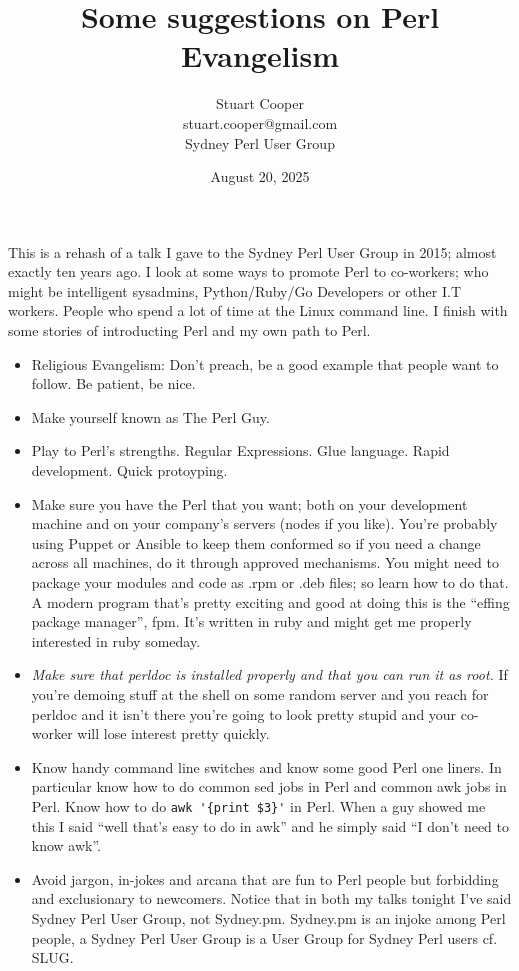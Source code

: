 \documentclass{article}
\title{Some suggestions on Perl Evangelism}
\author{Stuart Cooper\\stuart.cooper@gmail.com\\Sydney Perl User Group}
\date{August 20, 2025}
\begin{document}
\maketitle

This is a rehash of a talk I gave to the Sydney Perl User Group in
2015; almost exactly ten years ago. I look at some ways to
promote Perl to co-workers; who might be intelligent sysadmins,
Python/Ruby/Go Developers or other I.T workers. People
who spend a lot of time at the Linux command line. I finish with some
stories of introducting Perl and my own path to Perl.

\begin{itemize}
  \item Religious Evangelism: Don't preach, be a good example that
    people want to follow. Be patient, be nice.
  \item Make yourself known as The Perl Guy.
  \item Play to Perl's strengths. Regular Expressions. Glue
    language. Rapid development. Quick protoyping.
  \item Make sure you have the Perl that you want; both on your
    development machine and on your company's servers (nodes if you
    like). You're probably using Puppet or Ansible to keep them
    conformed so if you need a change across all machines, do it
    through approved mechanisms. You might need to package your
    modules and code as .rpm or .deb files; so learn how to do that. A
    modern program that's pretty exciting and good at doing this is
    the ``effing package manager'', fpm. It's written in ruby and
    might get me properly interested in ruby someday.
  \item \emph{Make sure that \emph{perldoc} is installed properly and that
  you can run it as root.} If you're demoing stuff at the shell on some
    random server and you reach for perldoc and it isn't there you're
    going to look pretty stupid and your co-worker will lose interest
    pretty quickly.
  \item Know handy command line switches and know some good Perl one
    liners. In particular know how to do common sed jobs in Perl and
    common awk jobs in Perl. Know how to do \verb!awk '{print $3}'!
    in Perl. When a guy showed me this I said ``well that's easy to do
    in awk'' and he simply said ``I don't need to know awk''.
  \item Avoid jargon, in-jokes and arcana that are fun to Perl people
    but forbidding and exclusionary to newcomers. Notice that in both
    my talks tonight I've said Sydney Perl User Group, not
    Sydney.pm. Sydney.pm is an injoke among Perl people, a Sydney Perl
    User Group is a User Group for Sydney Perl users cf. SLUG.
\end{itemize}
\end{document}
